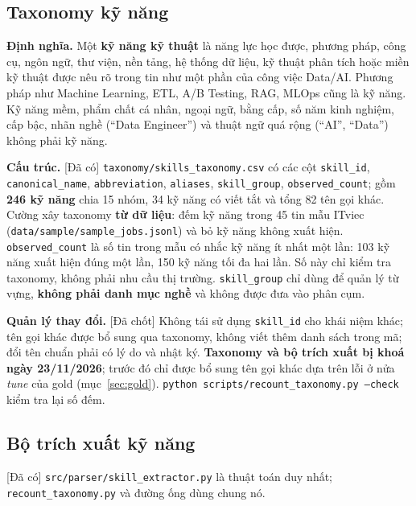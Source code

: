 \documentclass[12pt]{article}
\newcommand{\code}[1]{\texttt{#1}}
\newcommand{\dacoi}{\textsf{[Đã có]}}
\newcommand{\dachot}{\textsf{[Đã chốt]}}
\begin{document}
\subsection{Taxonomy kỹ năng}
\label{sec:taxonomy}

\textbf{Định nghĩa.} Một \textbf{kỹ năng kỹ thuật} là năng lực học được, phương pháp, công cụ, ngôn ngữ, thư viện, nền tảng, hệ thống dữ liệu, kỹ thuật phân tích hoặc miền kỹ thuật được nêu rõ trong tin như một phần của công việc Data/AI. Phương pháp như Machine Learning, ETL, A/B Testing, RAG, MLOps cũng là kỹ năng. Kỹ năng mềm, phẩm chất cá nhân, ngoại ngữ, bằng cấp, số năm kinh nghiệm, cấp bậc, nhãn nghề (``Data Engineer'') và thuật ngữ quá rộng (``AI'', ``Data'') không phải kỹ năng.

\textbf{Cấu trúc.} \dacoi{} \code{taxonomy/skills\_taxonomy.csv} có các cột \code{skill\_id}, \code{canonical\_name}, \code{abbreviation}, \code{aliases}, \code{skill\_group}, \code{observed\_count}; gồm \textbf{246 kỹ năng} chia 15 nhóm, 34 kỹ năng có viết tắt và tổng 82 tên gọi khác. Cường xây taxonomy \textbf{từ dữ liệu}: đếm kỹ năng trong 45 tin mẫu ITviec (\code{data/sample/sample\_jobs.jsonl}) và bỏ kỹ năng không xuất hiện. \code{observed\_count} là số tin trong mẫu có nhắc kỹ năng ít nhất một lần: 103 kỹ năng xuất hiện đúng một lần, 150 kỹ năng tối đa hai lần. Số này chỉ kiểm tra taxonomy, không phải nhu cầu thị trường. \code{skill\_group} chỉ dùng để quản lý từ vựng, \textbf{không phải danh mục nghề} và không được đưa vào phân cụm.

\textbf{Quản lý thay đổi.} \dachot{} Không tái sử dụng \code{skill\_id} cho khái niệm khác; tên gọi khác được bổ sung qua taxonomy, không viết thêm danh sách trong mã; đổi tên chuẩn phải có lý do và nhật ký. \textbf{Taxonomy và bộ trích xuất bị khoá ngày 23/11/2026}; trước đó chỉ được bổ sung tên gọi khác dựa trên lỗi ở nửa \textit{tune} của gold (mục~\ref{sec:gold}). \code{python scripts/recount\_taxonomy.py --check} kiểm tra lại số đếm.

\subsection{Bộ trích xuất kỹ năng}
\label{sec:parser}

\dacoi{} \code{src/parser/skill\_extractor.py} là thuật toán duy nhất; \code{recount\_taxonomy.py} và đường ống dùng chung nó.
\end{document}
